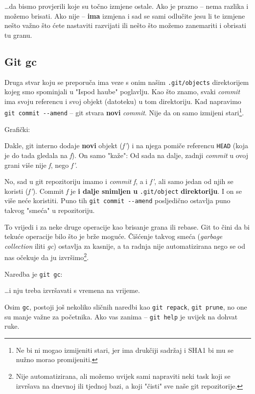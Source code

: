 \dots{}da bismo provjerili koje su točno izmjene ostale.
Ako je prazno -- nema razlika i možemo brisati.
Ako nije -- \textbf{ima} izmjena i sad se sami odlučite jesu li te izmjene nešto važno što ćete nastaviti razvijati ili nešto što možemo zanemariti i obrisati tu granu.

\subsection*{Git gc}

Druga stvar koju se preporuča ima veze s onim našim \verb+.git/objects+ direktorijem kojeg smo spominjali u "Ispod haube" poglavlju.
Kao što znamo, svaki \emph{commit} ima svoju referencu i svoj objekt (datoteku) u tom direktoriju.
Kad napravimo \verb+git commit --amend+ -- git stvara \textbf{novi} \emph{commit}.
Nije da on samo izmijeni stari\footnote{Ne bi ni mogao izmijeniti stari, jer ima drukčiji sadržaj i SHA1 bi mu se nužno morao promijeniti.}.

Grafički:



Dakle, git interno dodaje \textbf{novi} objekt (\emph{f'}) i na njega pomiče referencu \verb+HEAD+ (koja je do tada gledala na \emph f).
On samo "kaže": Od sada na dalje, zadnji \emph{commit} u ovoj grani više nije \emph f, nego \emph{f'}.

No, sad u git repozitoriju imamo i \emph{commit} \emph f, a i \emph{f'}, ali samo jedan od njih se koristi (\emph{f'}).
Commit \emph f je \textbf{i dalje snimljen u} \verb+.git/object+ \textbf{direktoriju}.
I on se više neće koristiti.
Puno tih \verb+git commit --amend+ posljedično ostavlja puno takvog "smeća" u repozitoriju.

To vrijedi i za neke druge operacije kao brisanje grana ili rebase.
Git to čini da bi tekuće operacije bilo što je brže moguće.
Čišćenje takvog smeća (\emph{garbage collection} iliti \emph{gc}) ostavlja za kasnije, a ta radnja nije automatizirana nego se od nas očekuje da ju izvršimo\footnote{Nije automatizirana, ali možemo uvijek sami napraviti neki task koji se izvršava na dnevnoj ili tjednoj bazi, a koji "čisti" sve naše git repozitorije.}.

Naredba je \verb+git gc+:



\dots{}i nju treba izvršavati s vremena na vrijeme.

Osim \verb+gc+, postoji još nekoliko sličnih naredbi kao \verb+git repack+, \verb+git prune+, no one su manje važne za početnika.
Ako vas zanima -- \verb+git help+ je uvijek na dohvat ruke.
